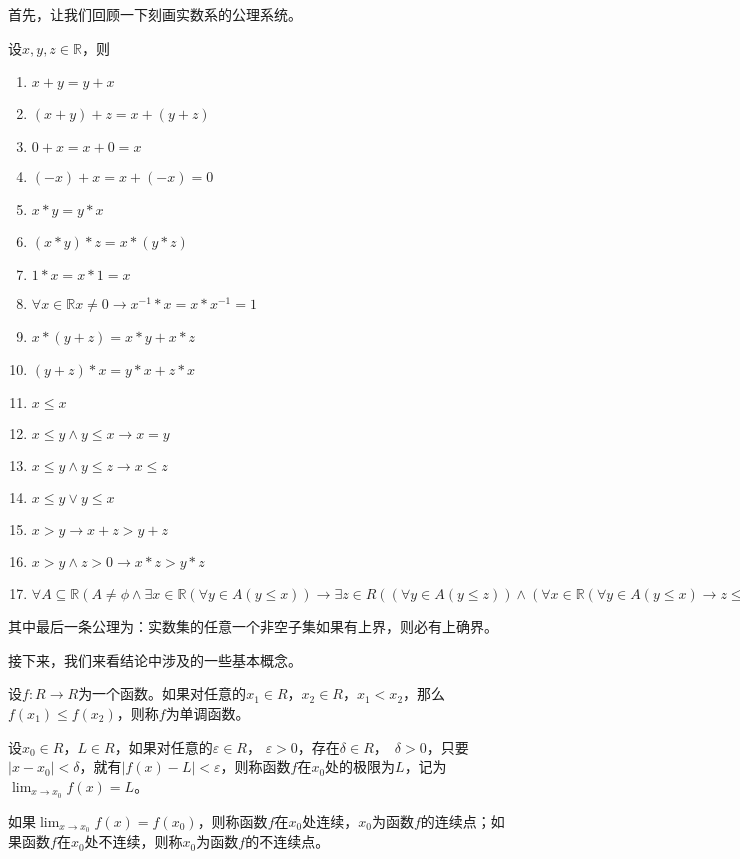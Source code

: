 

首先，让我们回顾一下刻画实数系的公理系统。

     设$x, y, z \in \mathbb{R}$，则
   \begin{enumerate}
   \item   $x + y = y + x$
   \item   $(x + y) + z = x + (y + z)$
   \item   $0 + x = x + 0 = x$
   \item   $(-x) + x = x + (-x) = 0$
   \item   $x * y = y * x$
   \item   $(x * y) * z = x * (y *z)$
   \item   $1 * x = x * 1 = x$
   \item   $\forall x \in \mathbb{R} x \neq 0 \to x^{-1} * x = x * x^{-1} = 1$
   \item   $x* (y + z) = x * y + x * z$
   \item   $(y + z) * x = y * x + z * x$
       \item $x \leq x$
   \item $ x \leq y \land y \leq x \rightarrow x = y$
   \item $x \leq y \land y \leq z \rightarrow x \leq z$
   \item $x \leq y \lor y \leq x$ 
\item $x > y \rightarrow x + z > y + z$
\item $x > y \land z >0 \rightarrow x * z > y * z$
\item   $\forall A \subseteq \mathbb{R} (A \neq \phi \land \exists x \in \mathbb{R} (\forall y \in A (y \leq x)) \rightarrow \exists z \in R ((\forall y \in A (y \leq z) )\land ( \forall x \in \mathbb{R} (\forall y \in A (y \leq x) \rightarrow z \leq x))))$   
    \end{enumerate}

其中最后一条公理为：实数集的任意一个非空子集如果有上界，则必有上确界。

接下来，我们来看结论中涉及的一些基本概念。

设$f:R\to R$为一个函数。如果对任意的$x_1\in R$，$x_2\in R$，$x_1< x_2$，那么$f(x_1) \leq f(x_2)$，则称$f$为单调函数。

设$x_0\in R$，$L\in R$，如果对任意的$\varepsilon\in R$， $\varepsilon> 0$，存在$\delta \in R$，　$\delta > 0$，只要$|x-x_0|<\delta$，就有$|f(x) - L|<\varepsilon$，则称函数$f$在$x_0$处的极限为$L$，记为$\lim_{x\to x_0}f(x)=L$。

如果$\lim_{x\to x_0}f(x)=f(x_0)$，则称函数$f$在$x_0$处连续，$x_0$为函数$f$的连续点；如果函数$f$在$x_0$处不连续，则称$x_0$为函数$f$的不连续点。

